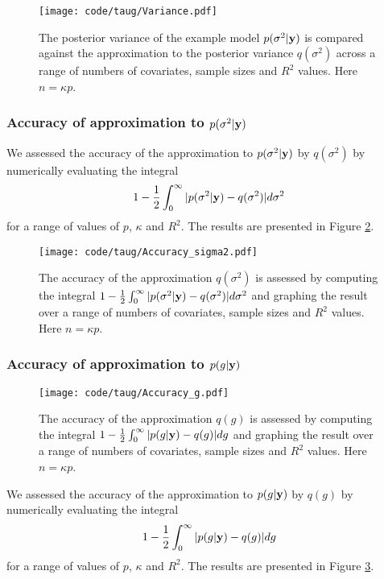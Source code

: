 \documentclass{amsart}[12pt]
\begin{document}
\begin{figure}[p]
	\texttt{[image: code/taug/Variance.pdf]}
	\caption{The posterior variance of the example model $p(\sigma^2 | {\bf y})$ is compared against the approximation
		to the posterior variance $q(\sigma^2)$ across a range of numbers of covariates, sample sizes and $R^2$
		values. Here $n = \kappa p$.}
	\label{fig:variance}
\end{figure}

\subsubsection{Accuracy of approximation to $p(\sigma^2 | {\bf y})$}

We assessed the accuracy of the approximation to $p(\sigma^2 | {\bf y})$ by $q(\sigma^2)$ by numerically evaluating
the integral
\[
	1 - \frac{1}{2} \int_0^\infty |p(\sigma^2 | {\bf y}) - q(\sigma^2)| d \sigma^2
\]
for a range of values of $p$, $\kappa$ and $R^2$. The results are presented in Figure \ref{fig:accuracy_sigma2}.

\begin{figure}[p]
	\texttt{[image: code/taug/Accuracy\_sigma2.pdf]}
	\caption{The accuracy of the approximation $q(\sigma^2)$ is assessed by computing the integral   $1 -
		\frac{1}{2} \int_0^\infty |p(\sigma^2 | {\bf y}) - q(\sigma^2)| d \sigma^2$ and graphing the result over a range
		of numbers of covariates, sample sizes and $R^2$  values. Here $n = \kappa p$.}
	\label{fig:accuracy_sigma2}
\end{figure}

\subsubsection{Accuracy of approximation to $p(g | {\bf y})$}

\begin{figure}[p]
	\texttt{[image: code/taug/Accuracy\_g.pdf]}
	\caption{The accuracy of the approximation $q(g)$ is assessed by computing the integral   $1 -
		\frac{1}{2} \int_0^\infty |p(g | {\bf y}) - q(g)| d g$ and graphing the result over a range
		of numbers of covariates, sample sizes and $R^2$  values. Here $n = \kappa p$.}
	\label{fig:accuracy_g}
\end{figure}

We assessed the accuracy of the approximation to $p(g | {\bf y})$ by $q(g)$ by numerically evaluating the integral
\[
	1 - \frac{1}{2} \int_0^\infty |p(g | {\bf y}) - q(g)| d g
\]
for a range of values of $p$, $\kappa$ and $R^2$. The results are presented in Figure \ref{fig:accuracy_g}.
\end{document}
